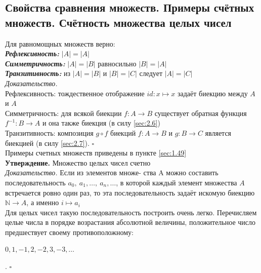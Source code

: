 \documentclass[a4paper]{article}
\newcommand{\qed}{\hfill$\square$}
\begin{document}
\subsection{Свойства сравнения множеств. Примеры счётных множеств. Счётность множества целых чисел}
Для равномощных множеств верно:\\[2mm]
\indent \textbf{\textit{Рефлексивность:}} $|A|=|A|$\\[2mm]
\indent \textbf{\textit{Симметричность:}} $|A|=|B|$ равносильно $|B|=|A|$\\[2mm]
\indent \textbf{\textit{Транзитивность:}} из $|A|=|B|$ и $|B|=|C|$ следует $|A|=|C|$\\[2mm]
\textit{Доказательство.}\\[2mm]
\indent Рефлексивность: тождественное отображение $id: x\mapsto x$ задаёт биекцию между $A$ и $A$\\[2mm]
\indent Симметричность: для всякой биекции $f : A\rightarrow B$ существует обратная функция $f^{-1}: B\rightarrow A$ и она также биекция (в силу \ref{sec:2.6})\\[2mm]
\indent Транзитивность: композиция $g\circ f$ биекций $f: A \rightarrow B$ и $g: B \rightarrow C$ является биекцией (в силу \ref{sec:2.7}). \qed\\[2mm]
Примеры счетных множеств приведены в пункте \ref{sec:1.49}\\[2mm]
\textbf{Утверждение.}  Множество целых чисел счетно\\[2mm]
\textit{Доказательство.} Если из элементов множе- ства A можно составить последовательность $a_0,\ a_1,\ldots,\ a_n,\ldots$, в которой каждый элемент множества $A$ встречается ровно один раз, то эта последовательность задаёт искомую биекцию $\mathbb{N}\rightarrow A$, а именно $i\mapsto a_i$\\[2mm]
\indent Для целых чисел такую последовательность построить очень легко. Перечисляем целые числа в порядке возрастания абсолютной величины, положительное число предшествует своему противоположному:\\[2mm]
\centerline{$0, 1,-1, 2, -2, 3, -3,\ldots$}. \qed\\[5mm]
\end{document}
